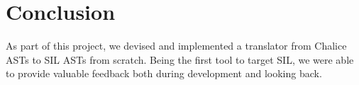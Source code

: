 
\section{Conclusion}\label{sct:conclusion}
As part of this project, we devised and implemented a translator from Chalice ASTs to SIL ASTs from scratch.
Being the first tool to target SIL, we were able to provide valuable feedback both during development and looking back.